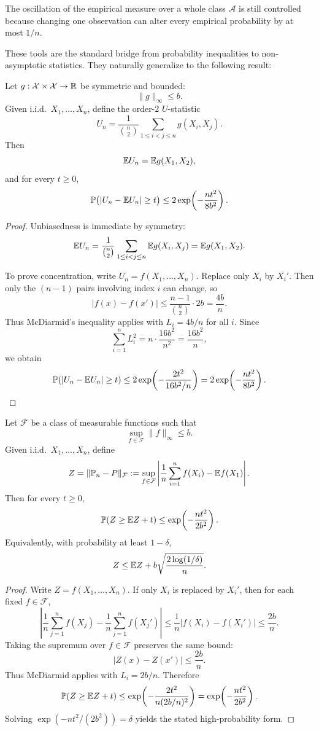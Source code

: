 \begin{remark}
The oscillation of the empirical measure over a whole class $\mathcal A$ is still controlled because changing one observation can alter every empirical probability by at most $1/n$.
\end{remark}

These tools are the standard bridge from probability inequalities to non-asymptotic statistics. They naturally generalize to the following result:
\begin{prop}
Let $g:\mathcal X\times \mathcal X\to \mathbb{R}$ be symmetric and bounded:
\[
\|g\|_\infty \le b.
\]
Given i.i.d.\ $X_1,\dots,X_n$, define the order-$2$ $U$-statistic
\[
U_n
=
\frac{1}{\binom{n}{2}}
\sum_{1\le i<j\le n} g(X_i,X_j).
\]
Then
\[
\mathbb{E} U_n = \mathbb{E} g(X_1,X_2),
\]
and for every $t\ge 0$,
\[
\mathbb{P}\bigl(|U_n-\mathbb{E} U_n|\ge t\bigr)
\le
2\exp\!\left(-\frac{n t^2}{8b^2}\right).
\]
\end{prop}

\begin{proof}
Unbiasedness is immediate by symmetry:
\[
\mathbb{E} U_n
=
\frac{1}{\binom{n}{2}}
\sum_{1\le i<j\le n}\mathbb{E} g(X_i,X_j)
=
\mathbb{E} g(X_1,X_2).
\]

To prove concentration, write $U_n=f(X_1,\dots,X_n)$. Replace only $X_i$ by $X_i'$. Then only the $(n-1)$ pairs involving index $i$ can change, so
\[
|f(x)-f(x')|
\le
\frac{n-1}{\binom{n}{2}}\cdot 2b
=
\frac{4b}{n}.
\]
Thus McDiarmid's inequality applies with $L_i=4b/n$ for all $i$. Since
\[
\sum_{i=1}^n L_i^2
=
n\cdot \frac{16b^2}{n^2}
=
\frac{16b^2}{n},
\]
we obtain
\[
\mathbb{P}(|U_n-\mathbb{E} U_n|\ge t)
\le
2\exp\!\left(
-\frac{2t^2}{16b^2/n}
\right)
=
2\exp\!\left(-\frac{nt^2}{8b^2}\right).
\]
\end{proof}


\begin{prop}
Let $\mathcal F$ be a class of measurable functions such that
\[
\sup_{f\in\mathcal F}\|f\|_\infty \le b.
\]
Given i.i.d.\ $X_1,\dots,X_n$, define
\[
Z
=
\|\mathbb P_n-P\|_{\mathcal F}
:=
\sup_{f\in\mathcal F}
\left|
\frac1n\sum_{i=1}^n f(X_i)-\mathbb{E} f(X_1)
\right|.
\]
Then for every $t\ge 0$,
\[
\mathbb{P}(Z\ge \mathbb{E} Z+t)
\le
\exp\!\left(-\frac{nt^2}{2b^2}\right).
\]
Equivalently, with probability at least $1-\delta$,
\[
Z
\le
\mathbb{E} Z + b\sqrt{\frac{2\log(1/\delta)}{n}}.
\]
\end{prop}

\begin{proof}
Write $Z=f(X_1,\dots,X_n)$. If only $X_i$ is replaced by $X_i'$, then for each fixed $f\in\mathcal F$,
\[
\left|
\frac1n\sum_{j=1}^n f(X_j) - \frac1n\sum_{j=1}^n f(X_j')
\right|
\le
\frac1n |f(X_i)-f(X_i')|
\le
\frac{2b}{n}.
\]
Taking the supremum over $f\in\mathcal F$ preserves the same bound:
\[
|Z(x)-Z(x')|\le \frac{2b}{n}.
\]
Thus McDiarmid applies with $L_i=2b/n$. Therefore
\[
\mathbb{P}(Z\ge \mathbb{E} Z+t)
\le
\exp\!\left(
-\frac{2t^2}{n(2b/n)^2}
\right)
=
\exp\!\left(-\frac{nt^2}{2b^2}\right).
\]
Solving $\exp(-nt^2/(2b^2))=\delta$ yields the stated high-probability form.
\end{proof}

